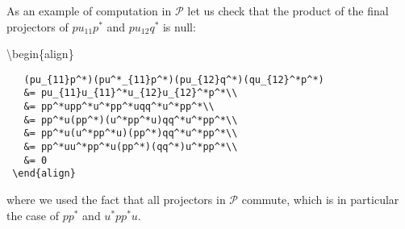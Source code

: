 As an example of computation in \(\mathcal{P}\) let us check that the
product of the final projectors of \(pu_{11}p^*\) and \(pu_{12}q^*\) is
null:

\begin{description}
\tightlist
\item[]
\textbackslash{}begin\{align\}
\end{description}

\texttt{~~~(pu\_\{11\}p\^{}*)(pu\^{}*\_\{11\}p\^{}*)(pu\_\{12\}q\^{}*)(qu\_\{12\}\^{}*p\^{}*)}\\
\texttt{~~~\&=~pu\_\{11\}u\_\{11\}\^{}*u\_\{12\}u\_\{12\}\^{}*p\^{}*\textbackslash{}\textbackslash{}}\\
\texttt{~~~\&=~pp\^{}*upp\^{}*u\^{}*pp\^{}*uqq\^{}*u\^{}*pp\^{}*\textbackslash{}\textbackslash{}}\\
\texttt{~~~\&=~pp\^{}*u(pp\^{}*)(u\^{}*pp\^{}*u)qq\^{}*u\^{}*pp\^{}*\textbackslash{}\textbackslash{}}\\
\texttt{~~~\&=~pp\^{}*u(u\^{}*pp\^{}*u)(pp\^{}*)qq\^{}*u\^{}*pp\^{}*\textbackslash{}\textbackslash{}}\\
\texttt{~~~\&=~pp\^{}*uu\^{}*pp\^{}*u(pp\^{}*)(qq\^{}*)u\^{}*pp\^{}*\textbackslash{}\textbackslash{}}\\
\texttt{~~~\&=~0}\\
\texttt{~\textbackslash{}end\{align\}}

where we used the fact that all projectors in \(\mathcal{P}\) commute,
which is in particular the case of \(pp^*\) and \(u^*pp^*u\).


